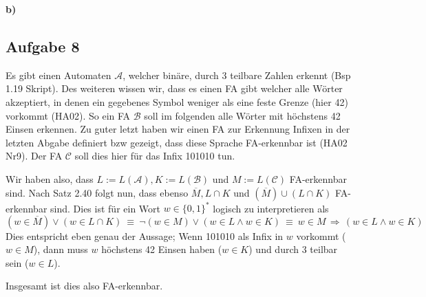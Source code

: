 \documentclass[a4paper,graphics,11pt]{article}
\newcommand{\aufgabe}[1]{\subsection*{Aufgabe #1}}
\begin{document}
\textbf{b)}\\

\aufgabe{8}
Es gibt einen Automaten $\mathcal{A}$, welcher binäre, durch 3 teilbare Zahlen erkennt (Bsp 1.19 Skript).
Des weiteren wissen wir, dass es einen FA gibt welcher alle Wörter akzeptiert,
in denen ein gegebenes Symbol weniger als eine feste Grenze (hier 42) vorkommt (HA02). So ein FA $\mathcal{B}$
soll im folgenden alle Wörter mit höchstens 42 Einsen erkennen.
Zu guter letzt haben wir einen FA zur Erkennung Infixen in der letzten Abgabe definiert bzw gezeigt, dass diese Sprache FA-erkennbar ist (HA02 Nr9). Der FA $\mathcal{C}$ soll dies hier für das Infix 101010 tun.

Wir haben also, dass $L := L(\mathcal{A}), K := L(\mathcal{B})$ und $M := L(\mathcal{C})$ FA-erkennbar sind.
Nach Satz 2.40 folgt nun, dass ebenso $\overline{M}, L \cap K$ und $(\overline{M}) \cup (L \cap K)$ FA-erkennbar
sind.
Dies ist für ein Wort $w \in \{0, 1\}^*$ logisch zu interpretieren als
$$
    (w \in \overline{M}) \lor (w \in L \cap K)\
    \equiv\ \lnot (w \in M) \lor (w \in L \land w \in K)\
    \equiv\ w \in M \,\Longrightarrow\, (w \in L \land w \in K)
$$
Dies entspricht eben genau der Aussage; Wenn 101010 als Infix in $w$ vorkommt ($w \in M$), dann muss 
$w$ höchstens 42 Einsen haben ($w \in K$) und durch 3 teilbar sein ($w \in L$).

Insgesamt ist dies also FA-erkennbar.
\end{document}

